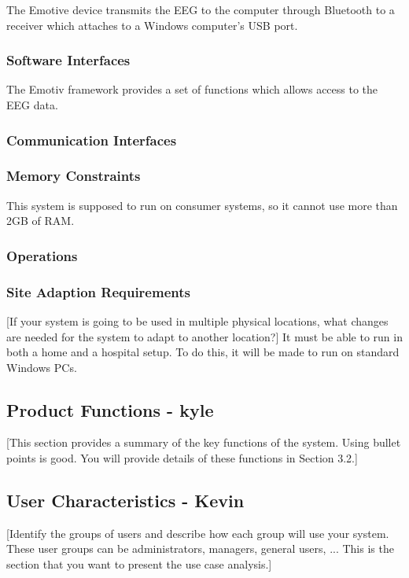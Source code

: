 \documentclass{report}
\begin{document}
The Emotive device transmits the EEG to the computer through Bluetooth to a receiver which attaches to a Windows computer's USB port.

\subsubsection{Software Interfaces}

The Emotiv framework provides a set of functions which allows access 	to the EEG data.

\subsubsection{Communication Interfaces}

\subsubsection{Memory Constraints}

This system is supposed to run on consumer systems, so it cannot use more than 2GB of RAM.

\subsubsection{Operations}

\subsubsection{Site Adaption Requirements}

[If your system is going to be used in multiple physical locations, what changes are needed for the system to adapt to another location?]
It must be able to run in both a home and a hospital setup. To do this, it will be made to run on standard Windows PCs.

\subsection{Product Functions - kyle}
[This section provides a summary of the key functions of the system. Using bullet points is good. You will provide details of these functions in Section 3.2.]

\subsection{User Characteristics - Kevin}

[Identify the groups of users and describe how each group will use your system. These user groups
can be administrators, managers, general users, ... This is the section that you want to present the use 
case analysis.]
\end{document}
